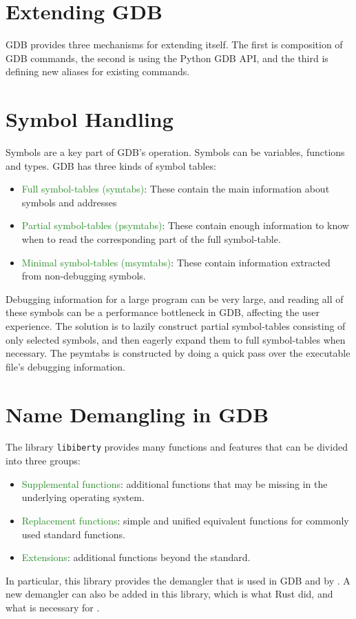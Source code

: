 \section{Extending GDB}
GDB provides three mechanisms for extending itself. The first is
composition of GDB commands, the second is using the Python GDB API, and the third is defining new aliases for existing commands.

\section{Symbol Handling}
Symbols are a key part of GDB's operation. Symbols can be variables, functions and
types. GDB has three kinds of symbol tables:
\begin{itemize}
    \item \textcolor{ForestGreen}{Full symbol-tables (symtabs)}: These contain the main information
        about symbols and addresses
    \item \textcolor{ForestGreen} {Partial symbol-tables (psymtabs)}: These contain enough information to
        know when to read the corresponding part of the full symbol-table.
    \item \textcolor{ForestGreen}{Minimal symbol-tables (msymtabs)}: These
        contain information extracted from non-debugging symbols.
\end{itemize}

Debugging information for a large program can be very large, and reading all of
these symbols can be a performance bottleneck in GDB, affecting the user
experience. The solution is to lazily construct partial symbol-tables consisting of
only selected symbols, and then eagerly expand them to full symbol-tables when
necessary.
The psymtabs is constructed by doing a quick pass over the executable file's
debugging information.

\section{Name Demangling in GDB}
The library \verb|libiberty| provides many functions and features that can be
divided into three groups:
\begin{itemize}
    \item \textcolor{ForestGreen}{Supplemental functions}: additional functions
        that may be missing in
        the underlying operating system.
    \item \textcolor{ForestGreen}{Replacement functions}: simple and unified equivalent functions for
        commonly used standard functions.
    \item \textcolor{ForestGreen}{Extensions}: additional functions beyond the standard.
\end{itemize}

In particular, this library provides the \CCS demangler that is used in GDB and
by \uCPP. A new
demangler can also be added in this library, which is what Rust did, and what
is necessary for \CFA.

